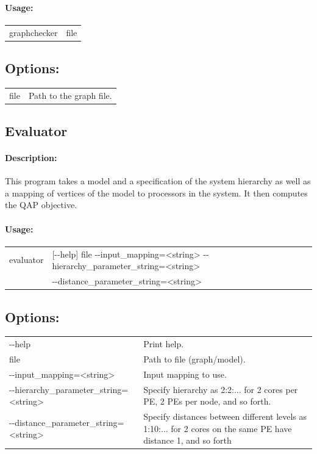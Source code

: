\documentclass[11pt]{article}
\begin{document}
\paragraph*{Usage:\\} 
\begin{tabular}{ll}
graphchecker & file
\end{tabular}
\subsection*{Options:\\} 
\begin{tabularx}{\textwidth}{lX}
  file                       & Path to the graph file. \\
\end{tabularx}

\subsection{Evaluator}
\paragraph*{Description:} This program takes a model and a specification of the system hierarchy as well as a mapping of vertices of the model to processors in the system. It then computes the QAP objective. 
\paragraph*{Usage:\\} 
\begin{tabular}{ll}
evaluator & [-{}-help] file -{}-input\_mapping=<string> -{}-hierarchy\_parameter\_string=<string> \\
          & -{}-distance\_parameter\_string=<string>
\end{tabular}
\subsection*{Options:\\} 
\begin{tabularx}{\textwidth}{lX}
  -{}-help                              &      Print help. \\
  file                                  & Path to file (graph/model). \\
  -{}-input\_mapping=<string>            &     Input mapping to use. \\
  -{}-hierarchy\_parameter\_string=<string> &   Specify hierarchy as 2:2:... for 2 cores per PE, 2 PEs per node, and so forth. \\
  -{}-distance\_parameter\_string=<string>  &   Specify distances between different levels as 1:10:... for 2 cores on the same PE have distance 1, and so forth

\end{tabularx}


\vfill\pagebreak


\end{document}
